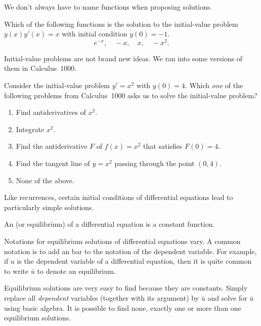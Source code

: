 \documentclass[../main.tex]{subfiles}
\begin{document}
We don't always have to name functions when proposing solutions.
\begin{example}
  Which of the following functions is the solution to the initial-value problem \(y(x)y'(x) = x\) with initial condition \(y(0) = -1\).
  \[
    e^{-x}, \quad -x, \quad x, \quad -x^{2}.
  \]
\end{example}

Initial-value problems are not brand new ideas. We ran into some versions of them in Calculus~1000.
\begin{example} \label{ex:diff-eq-IVP-calc-1000}
  Consider the initial-value problem \(y' = x^{2}\) with \(y(0) = 4\).  Which \emph{one} of the following problems from Calculus~1000 asks us to solve the initial-value problem?

  \begin{enumerate}[label=(\alph*)]
    \item Find antiderivatives of \(x^{2}\).
    \item Integrate \(x^{2}\).
    \item Find the antiderivative \(F\) of \(f(x) = x^{2}\) that satisfies \(F(0) = 4\).
    \item Find the tangent line of \(y = x^{2}\) passing through the point \((0,4)\).
    \item None of the above.
  \end{enumerate}
\end{example}
\clearpage

Like recurrences, certain initial conditions of differential equations lead to particularly simple solutions. 

\begin{definition} \label{def:diff-eq-equilibrium}
  An  (or equilibrium) of a differential equation is a constant function.  
\end{definition}

Notations for equilibrium solutions of differential equations vary. A common notation is to add an bar to the notation of the dependent variable. For example, if \(u\) is the dependent variable of a differential equation, then it is quite common to write \(\bar{u}\) to denote an equilibrium. 

\faStar{} Equilibrium solutions are very easy to find because they are constants. Simply replace all \emph{dependent} variables (together with its argument) by \(\bar{u}\) and solve for \(\bar{u}\) using basic algebra. It is possible to find none, exactly one or more than one equilibrium solutions.
\end{document}
